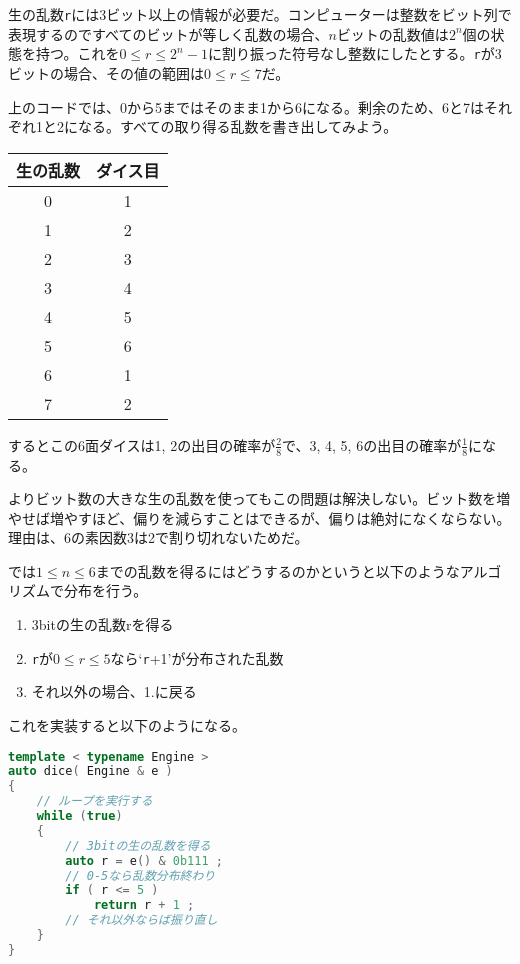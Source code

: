 生の乱数\texttt{r}には3ビット以上の情報が必要だ。コンピューターは整数をビット列で表現するのですべてのビットが等しく乱数の場合、\(n\)ビットの乱数値は\(2^n\)個の状態を持つ。これを\(0 \leq r \leq 2^n-1\)に割り振った符号なし整数にしたとする。\texttt{r}が3ビットの場合、その値の範囲は\(0 \leq r \leq 7\)だ。

上のコードでは、0から5まではそのまま1から6になる。剰余のため、6と7はそれぞれ1と2になる。すべての取り得る乱数を書き出してみよう。

\ifTombow\pagebreak\fi
\begin{small}
\begin{longtable}[]{@{\,\,}cc@{\,\,}}
\hline%
\textsf{生の乱数} & \textsf{ダイス目}\tabularnewline
\hline%
\endhead
0 & 1\tabularnewline
1 & 2\tabularnewline
2 & 3\tabularnewline
3 & 4\tabularnewline
4 & 5\tabularnewline
5 & 6\tabularnewline
6 & 1\tabularnewline
7 & 2\tabularnewline
\hline%
\end{longtable}
\end{small}

するとこの6面ダイスは1, 2の出目の確率が\(\frac{2}{8}\)で、3, 4, 5, 6の出目の確率が\(\frac{1}{8}\)になる。

よりビット数の大きな生の乱数を使ってもこの問題は解決しない。ビット数を増やせば増やすほど、偏りを減らすことはできるが、偏りは絶対になくならない。理由は、6の素因数3は2で割り切れないためだ。

では\(1 \leq n \leq 6\)までの乱数を得るにはどうするのかというと以下のようなアルゴリズムで分布を行う。

\begin{enumerate}
\def\labelenumi{\arabic{enumi}.}
\item
  3bitの生の乱数rを得る
\item
  \texttt{r}が\(0 \leq r \leq 5\)なら`\texttt{r}+1'が分布された乱数
\item
  それ以外の場合、1.に戻る
\end{enumerate}

これを実装すると以下のようになる。

\begin{lstlisting}[language={C++}]
template < typename Engine >
auto dice( Engine & e )
{
    // ループを実行する
    while (true)
    {
        // 3bitの生の乱数を得る
        auto r = e() & 0b111 ;
        // 0-5なら乱数分布終わり
        if ( r <= 5 )
            return r + 1 ;
        // それ以外ならば振り直し
    }
}
\end{lstlisting}

